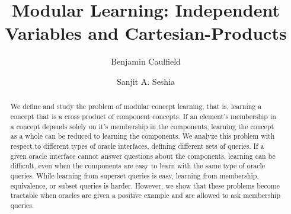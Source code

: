 \documentclass[runningheads]{llncs}
\begin{document}
%
\title{Modular Learning: Independent Variables and Cartesian-Products} %
%
%
\author{Benjamin Caulfield\and
Sanjit A. Seshia
}
%
%
%
\maketitle              %
%
\begin{abstract}
We define and study the problem of modular concept learning, that is, learning a concept that is a cross product of component concepts.
If an element's membership in a concept depends solely on it's membership in the components, learning the concept as a whole can be reduced to learning the components. 
We analyze this problem with respect to different types of oracle interfaces, defining different sets of queries.
If a given oracle interface cannot answer questions about the components, learning can be difficult, even when the components are easy to learn with the same type of oracle queries.
While learning from superset queries is easy, learning from membership, equivalence, or subset queries is harder. 
However, we show that these problems become tractable when oracles are given a positive example and are allowed to ask membership queries.
\end{abstract}
\end{document}
